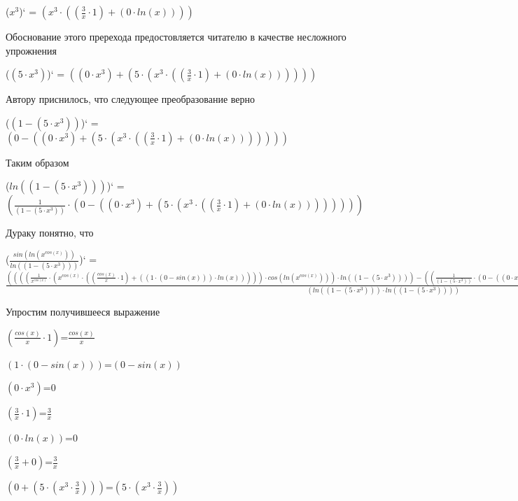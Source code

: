 \documentclass[12pt,a4paper,fleqn]{article}
\begin{document}
\begin{center}
($x^{3}$)`
 = $(x^{3} \cdot ((\frac{3}{x} \cdot 1) + (0 \cdot ln(x))))$\end{center}
Обоснование этого пререхода предостовляется читателю в качестве несложного упрожнения

\begin{center}
($(5 \cdot x^{3})$)`
 = $((0 \cdot x^{3}) + (5 \cdot (x^{3} \cdot ((\frac{3}{x} \cdot 1) + (0 \cdot ln(x))))))$\end{center}
Автору приснилось, что следующее преобразование верно

\begin{center}
($(1 - (5 \cdot x^{3}))$)`
 = $(0 - ((0 \cdot x^{3}) + (5 \cdot (x^{3} \cdot ((\frac{3}{x} \cdot 1) + (0 \cdot ln(x)))))))$\end{center}
Таким образом

\begin{center}
($ln((1 - (5 \cdot x^{3})))$)`
 = $(\frac{1}{(1 - (5 \cdot x^{3}))} \cdot (0 - ((0 \cdot x^{3}) + (5 \cdot (x^{3} \cdot ((\frac{3}{x} \cdot 1) + (0 \cdot ln(x))))))))$\end{center}
Дураку понятно, что

\begin{center}
($\frac{sin(ln(x^{cos(x)}))}{ln((1 - (5 \cdot x^{3})))}$)`
 = $\frac{((((\frac{1}{x^{cos(x)}} \cdot (x^{cos(x)} \cdot ((\frac{cos(x)}{x} \cdot 1) + ((1 \cdot (0 - sin(x))) \cdot ln(x))))) \cdot cos(ln(x^{cos(x)}))) \cdot ln((1 - (5 \cdot x^{3})))) - ((\frac{1}{(1 - (5 \cdot x^{3}))} \cdot (0 - ((0 \cdot x^{3}) + (5 \cdot (x^{3} \cdot ((\frac{3}{x} \cdot 1) + (0 \cdot ln(x)))))))) \cdot sin(ln(x^{cos(x)}))))}{(ln((1 - (5 \cdot x^{3}))) \cdot ln((1 - (5 \cdot x^{3}))))}$\end{center}


Упростим получившееся выражение

\begin{center}
$(\frac{cos(x)}{x} \cdot 1)$=$\frac{cos(x)}{x}$\end{center}
\begin{center}
$(1 \cdot (0 - sin(x)))$=$(0 - sin(x))$\end{center}
\begin{center}
$(0 \cdot x^{3})$=$0$\end{center}
\begin{center}
$(\frac{3}{x} \cdot 1)$=$\frac{3}{x}$\end{center}
\begin{center}
$(0 \cdot ln(x))$=$0$\end{center}
\begin{center}
$(\frac{3}{x} + 0)$=$\frac{3}{x}$\end{center}
\begin{center}
$(0 + (5 \cdot (x^{3} \cdot \frac{3}{x})))$=$(5 \cdot (x^{3} \cdot \frac{3}{x}))$\end{center}
\end{document}
